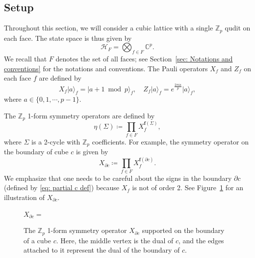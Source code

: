 \documentclass[aps,twocolumn,prx,floatfix,preprintnumbers, nofootinbib,10pt]{revtex4-2}
\numberwithin{equation}{section}
\theoremstyle{definition}
\theoremstyle{remark}
\theoremstyle{claim}
\def\ket#1{{|{#1}\rangle}}
\begin{document}
\subsection{Setup}
Throughout this section, we will consider a cubic lattice with a single $\mathbb{Z}_p$ qudit on each face.
The state space is thus given by
\begin{equation}
\mathcal{H}_F = \bigotimes_{f \in F} \mathbb{C}^p.
\label{eq: Zp Hilb}
\end{equation}
We recall that $F$ denotes the set of all faces; see Section~\ref{sec: Notations and conventions} for the notations and conventions.
The Pauli operators $X_f$ and $Z_f$ on each face $f$ are defined by
\begin{equation}
X_f \ket{a}_f = \ket{a+1 \bmod p}_f, \quad
Z_f \ket{a}_f = e^{\frac{2\pi i a}{p}} \ket{a}_f,
\end{equation}
where $a \in \{0, 1, \cdots, p-1\}$.

The $\mathbb{Z}_p$ 1-form symmetry operators are defined by
\begin{equation}
\eta(\Sigma) \coloneq \prod_{f \in F} X_f^{\bm{f}(\Sigma)},
\label{eq: Zp sym op}
\end{equation}
where $\Sigma$ is a 2-cycle with $\mathbb{Z}_p$ coefficients.
For example, the symmetry operator on the boundary of cube $c$ is given by
\begin{equation}
X_{\partial c} \coloneq \prod_{f \in F} X_f^{\bm{f}(\partial c)}.
\label{eq: symmetry bubble Zp}
\end{equation}
We emphasize that one needs to be careful about the signs in the boundary $\partial c$ (defined by \eqref{eq: partial c def}) because $X_f$ is not of order 2.
See Figure~\ref{fig: symmetry bubble Zp} for an illustration of $X_{\partial c}$.
\begin{figure}[t]
\centering
$X_{\partial c} =$
\caption{The $\mathbb{Z}_p$ 1-form symmetry operator $X_{\partial c}$ supported on the boundary of a cube $c$. Here, the middle vertex is the dual of $c$, and the edges attached to it represent the dual of the boundary of $c$.}
\label{fig: symmetry bubble Zp}
\end{figure}
\end{document}

